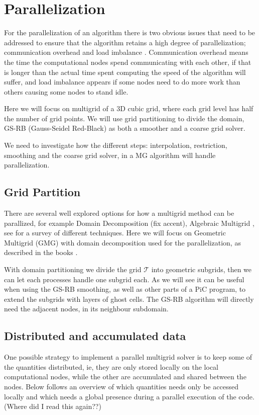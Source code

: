 \section{Parallelization}
	For the parallelization of an algorithm there is two obvious issues that need
	to be addressed to ensure that the algorithm retains a high degree of parallelization;
	communication overhead and load imbalance \citep{hackbusch_multigrid_1982}.
	Communication overhead means the time the computational nodes spend communicating
	with each other, if that is longer than the actual time spent computing the speed
	of the algorithm will suffer, and load imbalance appears if some nodes need to
	do more work than others causing some nodes to stand idle.

	Here we will focus on multigrid of a 3D cubic grid, where each grid level has
	half the number of grid points. We will use grid
	partitioning to divide the domain, GS-RB (Gauss-Seidel Red-Black) as both a
	smoother and a coarse grid solver.

	We need to investigate how the different steps: interpolation, restriction,
	smoothing and the coarse grid solver, in a MG algorithm will handle parallelization.

	\subsection{Grid Partition}
		\label{sec:grid_partitioning}
		There are several well explored options for how a multigrid method can be
		parallized, for example Domain Decomposition \citep{arraras_domain_2015} (fix accent),
		Algebraic Multigrid \citep{stuben_review_2001}, see \citet{chow_survey_2006}
		for a survey of different techniques. Here we will focus on Geometric
		Multigrid (GMG) with domain decomposition used for the parallelization, as
		described in the books \cite{trottenberg_multigrid_2000, hackbusch_multigrid_1982}.

		With domain partitioning we divide the grid \(\mathcal{T}\) into geometric
		subgrids, then we can let each processes handle one subgrid each. As we will
		see it can be useful when using the GS-RB smoothing, as well as other parts
	    of a PiC program, to extend the subgrids with layers of ghost cells. The GS-RB
	    algorithm will directly need the adjacent nodes, in its neighbour subdomain.

	\subsection{Distributed and accumulated data}
		One possible strategy to implement a parallel multigrid solver is to keep
		some of the quantities distributed, ie, they are only stored locally
		on the local computational nodes, while the other are accumulated and
		shared between the nodes. Below follows an overview of which quantities
		needs only be accessed locally and which needs a global presence
		during a parallel execution of the code. (Where did I read this again??)

